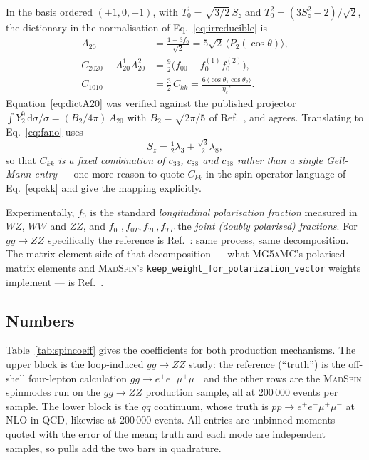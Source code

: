 \documentclass[a4paper,11pt]{article}
\providecommand{\mg}{{\textsc{MG5aMC}}}
\providecommand{\ms}{{\textsc{MadSpin}}}
\providecommand{\code}[1]{\texttt{#1}}
\providecommand{\etal}{\ensuremath{\eta_\ell}}          %
\providecommand{\ckk}{\ensuremath{C_{kk}}}              %
\begin{document}
In the basis ordered $(+1,0,-1)$, with $T^1_0=\sqrt{3/2}\,S_z$ and
$T^2_0=(3S_z^2-2)/\sqrt2$, the dictionary in the normalisation of
Eq.~\eqref{eq:irreducible} is
\begin{align}
  A_{20}&=\frac{1-3f_0}{\sqrt2}=5\sqrt2\,\langle P_2(\cos\theta)\rangle, \label{eq:dictA20}\\
  C_{2020}-A^1_{20}A^2_{20}&=\tfrac92\big(f_{00}-f_0^{(1)}f_0^{(2)}\big), \label{eq:dictC2020}\\
  C_{1010}&=\tfrac32\,\ckk=\frac{6\,\langle\cos\theta_1\cos\theta_2\rangle}{\etal^2}. \label{eq:dictC1010}
\end{align}
Equation~\eqref{eq:dictA20} was verified against the published projector
$\int Y^0_2\,\mathrm{d}\sigma/\sigma=(B_2/4\pi)\,A_{20}$ with
$B_2=\sqrt{2\pi/5}$ of Ref.~\cite{Aguilar-Saavedra:2022wam}, and agrees.
Translating to Eq.~\eqref{eq:fano} uses
\begin{equation}
  S_z=\tfrac12\lambda_3+\tfrac{\sqrt3}{2}\lambda_8 ,
  \label{eq:szgellmann}
\end{equation}
so that \emph{$\ckk$ is a fixed combination of $c_{33}$, $c_{88}$ and $c_{38}$
rather than a single Gell-Mann entry} --- one more reason to quote $\ckk$ in
the spin-operator language of Eq.~\eqref{eq:ckk} and give the mapping
explicitly.

Experimentally, $f_0$ is the standard \emph{longitudinal polarisation
fraction} measured in $WZ$, $WW$ and $ZZ$, and $f_{00},f_{0T},f_{T0},f_{TT}$
the \emph{joint (doubly polarised) fractions}. For $gg\to ZZ$ specifically the
reference is Ref.~\cite{Javurkova:2024bwa}: same process, same decomposition.
The matrix-element side of that decomposition --- what \mg's polarised matrix
elements and \ms's \code{keep\_weight\_for\_polarization\_vector} weights
implement --- is Ref.~\cite{BuarqueFranzosi:2019boy}.

\subsection{Numbers}
\label{subsec:spinobs_numbers}

Table~\ref{tab:spincoeff} gives the coefficients for both production
mechanisms. The upper block is the loop-induced $gg\to ZZ$ study: the reference
(``truth'') is the off-shell four-lepton calculation $gg\to e^+e^-\mu^+\mu^-$
and the other rows are the \ms{} spinmodes run on the $gg\to ZZ$ production
sample, all at $200\,000$ events per sample. The lower block is the $q\bar q$
continuum, whose truth is $pp\to e^+e^-\mu^+\mu^-$ at NLO in QCD, likewise at
$200\,000$ events. All entries are unbinned moments quoted with the error of the
mean; truth and each mode are independent samples, so pulls add the two bars in
quadrature.
\end{document}

